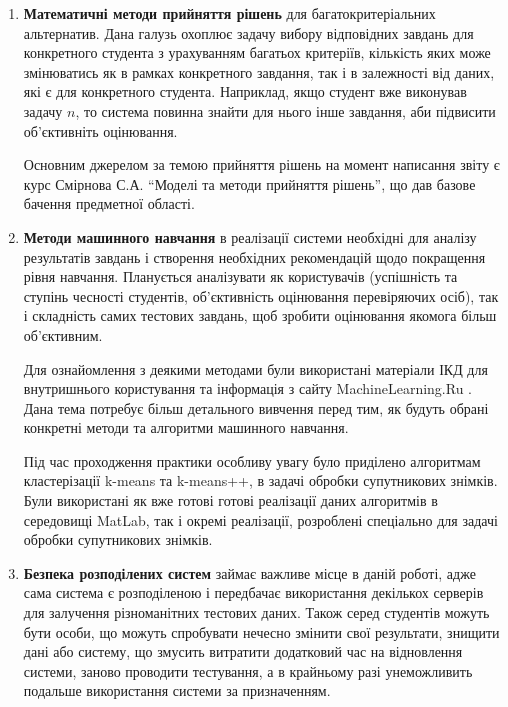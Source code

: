 \begin{enumerate}
    \item
        \textbf{Математичні методи прийняття рішень} для багатокритеріальних
        альтернатив.
        Дана галузь охоплює задачу вибору відповідних завдань для
        конкретного студента з урахуванням багатьох критеріїв, кількість яких
        може змінюватись як в рамках конкретного завдання, так і в залежності
        від даних, які є для конкретного студента.
        Наприклад, якщо студент вже виконував задачу $n$, то система повинна
        знайти для нього інше завдання, аби підвисити об’єктивніть оцінювання.

        Основним джерелом за темою прийняття рішень на момент написання звіту
        є курс Смірнова С.А. ``Моделі та методи прийняття рішень'', що дав
        базове бачення предметної області.
    \item
        \textbf{Методи машинного навчання} в реалізації системи необхідні для
        аналізу результатів завдань і створення необхідних рекомендацій щодо
        покращення рівня навчання. Планується аналізувати як користувачів
        (успішність та ступінь чесності студентів, об’єктивність оцінювання
        перевіряючих осіб), так і складність самих тестових завдань,
        щоб зробити оцінювання якомога більш об’єктивним.

        Для ознайомлення з деякими методами були використані матеріали ІКД
        для внутришнього користування та інформація з сайту MachineLearning.Ru
        \cite{Machinelearning}.
        Дана тема потребує більш детального вивчення перед тим, як будуть
        обрані конкретні методи та алгоритми машинного навчання.

        Під час проходження практики особливу увагу було приділено алгоритмам
        кластерізації k-means та k-means++, в задачі обробки супутникових
        знімків. Були використані як вже готові готові реалізації даних
        алгоритмів в середовищі MatLab, так і окремі реалізації, розроблені
        спеціально для задачі обробки супутникових знімків.
    \item
        \textbf{Безпека розподілених систем} займає важливе місце в даній
        роботі, адже сама система є розподіленою і передбачає використання
        декількох серверів для залучення різноманітних тестових даних.
        Також серед студентів можуть бути особи, що можуть спробувати нечесно
        змінити свої результати, знищити дані або систему, що змусить
        витратити додатковий час на відновлення системи, заново проводити
        тестування, а в крайньому разі унеможливить подальше використання
        системи за призначенням.
\end{enumerate}
